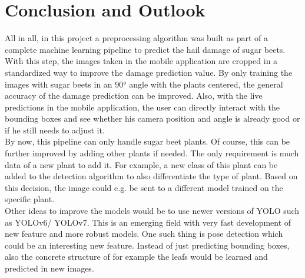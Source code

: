 
\chapter{Conclusion and Outlook}
All in all, in this project a preprocessing algorithm was built as part of a complete machine learning pipeline to predict the hail damage of sugar beets. With this step, the images taken in the mobile application are cropped in a standardized way to improve the damage prediction value. By only training the images with sugar beets in an $ 90° $ angle with the plants centered, the general accuracy of the damage prediction can be improved. Also, with the live predictions in the mobile application, the user can directly interact with the bounding boxes and see whether his camera position and angle is already good or if he still needs to adjust it. \\

By now, this pipeline can only handle sugar beet plants. Of course, this can be further improved by adding other plants if needed. The only requirement is much data of a new plant to add it. For example, a new class of this plant can be added to the detection algorithm to also differentiate the type of plant. Based on this decision, the image could e.g. be sent to a different model trained on the specific plant. \\

Other ideas to improve the models would be to use newer versions of YOLO such as YOLOv6/ YOLOv7. This is an emerging field with very fast development of new feature and more robust models. One such thing is pose detection which could be an interesting new feature. Instead of just predicting bounding boxes, also the concrete structure of for example the leafs would be learned and predicted in new images.
